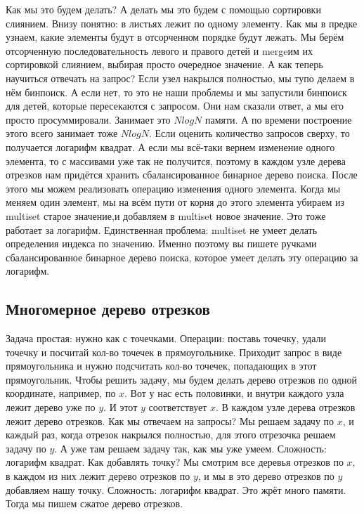 \documentclass[12pt]{article}
\begin{document}
Как мы это будем делать? А делать мы это будем с помощью сортировки слиянием. Внизу понятно: в листьях лежит по одному элементу. Как мы в предке узнаем, какие элементы будут в отсорченном порядке будут лежать. Мы берём отсорченную последовательность левого и правого детей и mergeим их сортировкой слиянием, выбирая просто очередное значение. А как теперь научиться отвечать на запрос? Если узел накрылся полностью, мы тупо делаем в нём бинпоиск. А если нет, то это не наши проблемы и мы запустили бинпоиск для детей, которые пересекаются с запросом. Они нам сказали ответ, а мы его просто просуммировали. Занимает это $NlogN$ памяти. А по времени построение этого всего занимает тоже $NlogN$. Если оценить количество запросов сверху, то получается логарифм квадрат. А если мы всё-таки вернем изменение одного элемента, то с массивами уже так не получится, поэтому в каждом узле дерева отрезков нам придётся хранить сбалансированное бинарное дерево поиска. После этого мы можем реализовать операцию изменения одного элемента. Когда мы меняем один элемент, мы на всём пути от корня до этого элемента убираем из multiset старое значение,и добавляем в multiset новое значение. Это тоже работает за логарифм. Единственная проблема: multiset не умеет делать определения индекса по значению. Именно поэтому вы пишете ручками сбалансированное бинарное дерево поиска, которое умеет делать эту операцию за логарифм. 

\subsection*{Многомерное дерево отрезков}
Задача простая: нужно как с точечками. Операции: поставь точечку, удали точечку и посчитай кол-во точечек в прямоугольнике. Приходит запрос в виде прямоугольника и нужно подсчитать кол-во точечек, попадающих в этот прямоугольник. Чтобы решить задачу, мы будем делать дерево отрезков по одной координате, например, по $x$. Вот у нас есть половинки, и внутри каждого узла лежит дерево уже по $y$. И этот $y$ соответствует $x$. В каждом узле дерева отрезков лежит дерево отрезков. Как мы отвечаем на запросы? Мы решаем задачу по $x$, и каждый раз, когда отрезок накрылся полностью, для этого отрезочка решаем задачу по $y$. А уже там решаем задачу так, как мы уже умеем. Сложность: логарифм квадрат. Как добавлять точку? Мы смотрим все деревья отрезков по $x$, в каждом из них лежит дерево отрезков по $y$, и мы в это дерево отрезков по $y$ добавляем нашу точку. Сложность: логарифм квадрат. Это жрёт много памяти. Тогда мы пишем сжатое дерево отрезков.
\end{document}
